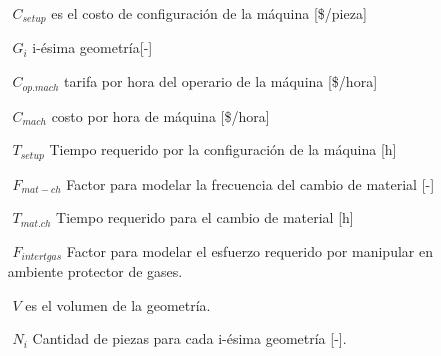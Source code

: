 \begin{description}
\begin{itemize}
\item[$ $] $C_{setup} $ es el costo de configuración de la máquina [\$/pieza]
\item[$ $] $G_i $ i-ésima geometría[-]
\item[$ $] $C_{op.mach} $ tarifa por hora del operario de la máquina [\$/hora]
\item[$ $] $C_{mach} $ costo por hora de máquina [\$/hora]
\item[$ $] $T_{setup} $ Tiempo requerido por la configuración de la máquina [h]
\item[$ $] $F_{mat-ch} $ Factor para modelar la frecuencia del cambio de material [-]
\item[$ $] $T_{mat.ch} $ Tiempo requerido para el cambio de material [h]
\item[$ $] $F_{intertgas} $ Factor para modelar el esfuerzo requerido por manipular en ambiente protector de gases.
\item[$ $] $V $ es el volumen de la geometría.
\item[$ $] $N_i$ Cantidad de piezas para cada i-ésima geometría [-].


\end{itemize}

\end{description}

